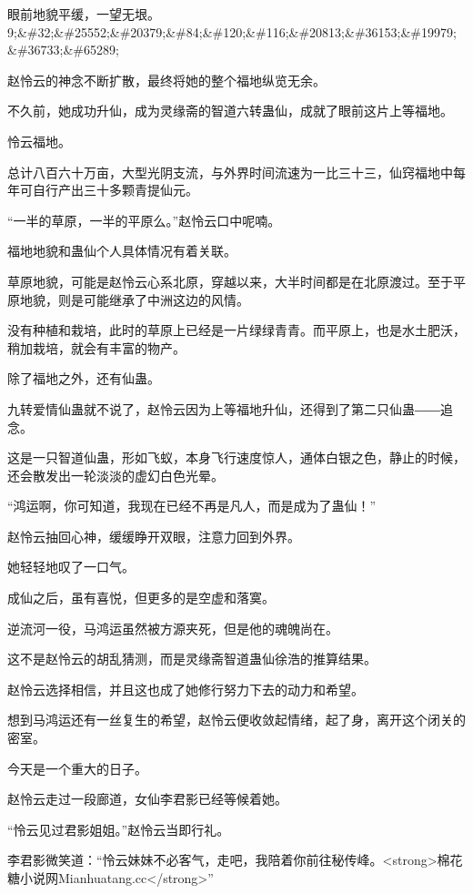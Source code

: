 
\begin{this_body}

眼前地貌平缓，一望无垠。9;\&\#32;\&\#25552;\&\#20379;\&\#84;\&\#120;\&\#116;\&\#20813;\&\#36153;\&\#19979;\&\#36733;\&\#65289;

赵怜云的神念不断扩散，最终将她的整个福地纵览无余。

不久前，她成功升仙，成为灵缘斋的智道六转蛊仙，成就了眼前这片上等福地。

怜云福地。

总计八百六十万亩，大型光阴支流，与外界时间流速为一比三十三，仙窍福地中每年可自行产出三十多颗青提仙元。

“一半的草原，一半的平原么。”赵怜云口中呢喃。

福地地貌和蛊仙个人具体情况有着关联。

草原地貌，可能是赵怜云心系北原，穿越以来，大半时间都是在北原渡过。至于平原地貌，则是可能继承了中洲这边的风情。

没有种植和栽培，此时的草原上已经是一片绿绿青青。而平原上，也是水土肥沃，稍加栽培，就会有丰富的物产。

除了福地之外，还有仙蛊。

九转爱情仙蛊就不说了，赵怜云因为上等福地升仙，还得到了第二只仙蛊――追念。

这是一只智道仙蛊，形如飞蚁，本身飞行速度惊人，通体白银之色，静止的时候，还会散发出一轮淡淡的虚幻白色光晕。

“鸿运啊，你可知道，我现在已经不再是凡人，而是成为了蛊仙！”

赵怜云抽回心神，缓缓睁开双眼，注意力回到外界。

她轻轻地叹了一口气。

成仙之后，虽有喜悦，但更多的是空虚和落寞。

逆流河一役，马鸿运虽然被方源夹死，但是他的魂魄尚在。

这不是赵怜云的胡乱猜测，而是灵缘斋智道蛊仙徐浩的推算结果。

赵怜云选择相信，并且这也成了她修行努力下去的动力和希望。

想到马鸿运还有一丝复生的希望，赵怜云便收敛起情绪，起了身，离开这个闭关的密室。

今天是一个重大的日子。

赵怜云走过一段廊道，女仙李君影已经等候着她。

“怜云见过君影姐姐。”赵怜云当即行礼。

李君影微笑道：“怜云妹妹不必客气，走吧，我陪着你前往秘传峰。<strong>棉花糖小说网Mianhuatang.cc</strong>”


\end{this_body}
